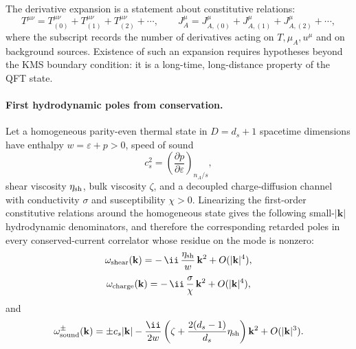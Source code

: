 The derivative expansion is a statement about constitutive relations:
\begin{equation}
  T^{\mu\nu}
  =
  T^{\mu\nu}_{(0)}+T^{\mu\nu}_{(1)}+T^{\mu\nu}_{(2)}+\cdots,
  \qquad
  J_A^\mu
  =
  J_{A,(0)}^\mu+J_{A,(1)}^\mu+J_{A,(2)}^\mu+\cdots,
  \label{eq:thermal-hydrodynamic-derivative-expansion}
\end{equation}
where the subscript records the number of derivatives acting on
\(T,\mu_A,u^\mu\) and on background sources.  Existence of such an expansion
requires hypotheses beyond the KMS boundary condition: it is a long-time,
long-distance property of the QFT state.

\paragraph{First hydrodynamic poles from conservation.}
Let a homogeneous parity-even thermal state in \(D=d_s+1\) spacetime
dimensions have enthalpy \(w=\varepsilon+p>0\), speed of sound
\[
  c_s^2=\left(\frac{\partial p}{\partial\varepsilon}\right)_{\!n_A/s},
\]
shear viscosity \(\eta_{\rm sh}\), bulk viscosity \(\zeta\), and a decoupled
charge-diffusion channel with conductivity \(\sigma\) and susceptibility
\(\chi>0\).  Linearizing the first-order constitutive relations around the
homogeneous state gives the following small-\(|\mathbf k|\) hydrodynamic
denominators, and therefore the corresponding retarded poles in every
conserved-current correlator whose residue on the mode is nonzero:
\begin{equation}
  \omega_{\rm shear}(\mathbf k)
  =
  -\,\ii\,\frac{\eta_{\rm sh}}{w}\,\mathbf k^2+O(|\mathbf k|^4),
  \label{eq:kms-shear-pole}
\end{equation}
\begin{equation}
  \omega_{\rm charge}(\mathbf k)
  =
  -\,\ii\,\frac{\sigma}{\chi}\,\mathbf k^2+O(|\mathbf k|^4),
  \label{eq:kms-charge-diffusion-pole}
\end{equation}
and
\begin{equation}
  \omega_{\rm sound}^{\pm}(\mathbf k)
  =
  \pm c_s|\mathbf k|
  -\frac{\ii}{2w}
  \left(\zeta+\frac{2(d_s-1)}{d_s}\eta_{\rm sh}\right)
  \mathbf k^2
  +O(|\mathbf k|^3).
  \label{eq:kms-sound-poles}
\end{equation}

